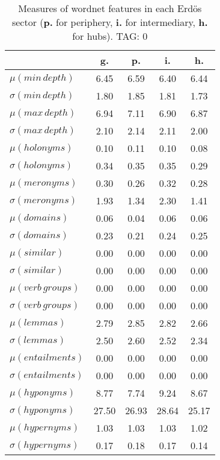 \begin{table}[h!]
\begin{center}
\begin{tabular}{| l | c | c | c | c |}\hline
 & g. & p. & i. & h. \\\hline
$\mu(min\,depth)$ & 6.45  & 6.59  & 6.40  & 6.44 \\\hline
$\sigma(min\,depth)$ & 1.80  & 1.85  & 1.81  & 1.73 \\\hline
$\mu(max\,depth)$ & 6.94  & 7.11  & 6.90  & 6.87 \\\hline
$\sigma(max\,depth)$ & 2.10  & 2.14  & 2.11  & 2.00 \\\hline
$\mu(holonyms)$ & 0.10  & 0.11  & 0.10  & 0.08 \\\hline
$\sigma(holonyms)$ & 0.34  & 0.35  & 0.35  & 0.29 \\\hline
$\mu(meronyms)$ & 0.30  & 0.26  & 0.32  & 0.28 \\\hline
$\sigma(meronyms)$ & 1.93  & 1.34  & 2.30  & 1.41 \\\hline
$\mu(domains)$ & 0.06  & 0.04  & 0.06  & 0.06 \\\hline
$\sigma(domains)$ & 0.23  & 0.21  & 0.24  & 0.25 \\\hline
$\mu(similar)$ & 0.00  & 0.00  & 0.00  & 0.00 \\\hline
$\sigma(similar)$ & 0.00  & 0.00  & 0.00  & 0.00 \\\hline
$\mu(verb\,groups)$ & 0.00  & 0.00  & 0.00  & 0.00 \\\hline
$\sigma(verb\,groups)$ & 0.00  & 0.00  & 0.00  & 0.00 \\\hline
$\mu(lemmas)$ & 2.79  & 2.85  & 2.82  & 2.66 \\\hline
$\sigma(lemmas)$ & 2.50  & 2.60  & 2.52  & 2.34 \\\hline
$\mu(entailments)$ & 0.00  & 0.00  & 0.00  & 0.00 \\\hline
$\sigma(entailments)$ & 0.00  & 0.00  & 0.00  & 0.00 \\\hline
$\mu(hyponyms)$ & 8.77  & 7.74  & 9.24  & 8.67 \\\hline
$\sigma(hyponyms)$ & 27.50  & 26.93  & 28.64  & 25.17 \\\hline
$\mu(hypernyms)$ & 1.03  & 1.03  & 1.03  & 1.02 \\\hline
$\sigma(hypernyms)$ & 0.17  & 0.18  & 0.17  & 0.14 \\\hline
\end{tabular}
\caption{Measures of wordnet features in each Erd\"os sector ({{\bf p.}} for periphery, {{\bf i.}} for intermediary, {{\bf h.}} for hubs). TAG: 0}
\end{center}
\end{table}